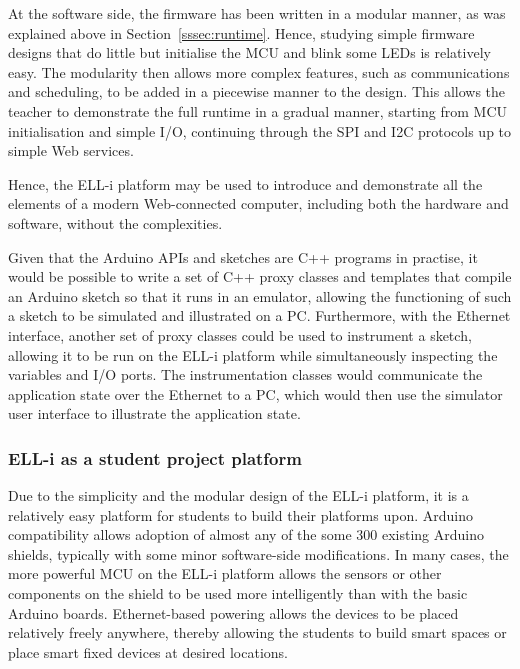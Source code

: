 \documentclass{siamltex}
\begin{document}
At the software side, the firmware has been written in a modular
manner, as was explained above in Section~\ref{sssec:runtime}.  Hence,
studying simple firmware designs that do little but initialise the MCU
and blink some LEDs is relatively easy.  The modularity then allows
more complex features, such as communications and scheduling, to be
added in a piecewise manner to the design.  This allows the teacher to
demonstrate the full runtime in a gradual manner, starting from MCU
initialisation and simple I/O, continuing through the SPI and I2C
protocols up to simple Web services.

Hence, the ELL-i platform may be used to introduce and demonstrate all
the elements of a modern Web-connected computer, including both the
hardware and software, without the complexities.


Given that the Arduino APIs and sketches are C++ programs in practise,
it would be possible to write a set of C++ proxy classes and templates that
compile an Arduino sketch so that it runs in an emulator, allowing the
functioning of such a sketch to be simulated and illustrated on a PC.
Furthermore, with the Ethernet interface, another set of proxy classes
could be used to instrument a sketch, allowing it to be run on the
ELL-i platform while simultaneously inspecting the variables and I/O
ports.  The instrumentation classes would communicate the
application state over the Ethernet to a PC, which would then use the
simulator user interface to illustrate the application state.

\subsubsection{ELL-i as a student project platform}

Due to the simplicity and the modular design of the ELL-i platform, it
is a relatively easy platform for students to build their platforms
upon.  Arduino compatibility allows adoption of almost any of the
some 300 existing Arduino shields, typically with some minor
software-side modifications.  In many cases, the more powerful MCU on
the ELL-i platform allows the sensors or other components on the
shield to be used more intelligently than with the basic Arduino
boards.  Ethernet-based powering allows the devices to be placed
relatively freely anywhere, thereby allowing the students to build
smart spaces or place smart fixed devices at desired locations.
\end{document}
